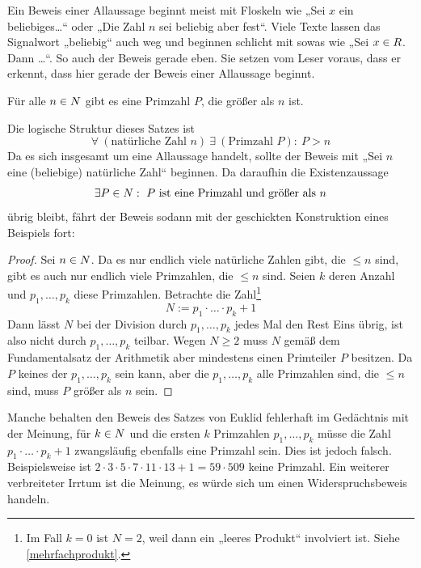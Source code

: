   
\begin{bem}[Signalwörter]
    Ein Beweis einer Allaussage beginnt meist mit Floskeln wie „Sei $x$ ein beliebiges\dots“ oder „Die Zahl $n$ sei beliebig aber fest“. Viele Texte lassen das Signalwort „beliebig“ auch weg und beginnen schlicht mit sowas wie „Sei $x\in \relax R$. Dann \dots“. So auch der Beweis gerade eben. Sie setzen vom Leser voraus, dass er erkennt, dass hier gerade der Beweis einer Allaussage beginnt.
\end{bem}


\begin{bsp} \label{euklid}
    Für alle $n\in \relax N$ gibt es eine Primzahl $P$, die größer als $n$ ist.
\end{bsp}
\begin{bem}
    Die logische Struktur dieses Satzes ist
        \[ \forall\ (\text{natürliche Zahl $n$})\ \exists\ (\text{Primzahl $P$}):\ P>n \]
    Da es sich insgesamt um eine Allaussage handelt, sollte der Beweis mit „Sei $n$ eine (beliebige) natürliche Zahl“ beginnen. Da daraufhin die Existenzaussage
        \[ \exists P\in \relax N:\ \text{$P$ ist eine Primzahl und größer als $n$} \]
    übrig bleibt, fährt der Beweis sodann mit der geschickten Konstruktion eines Beispiels fort:
\end{bem}
\begin{proof}
    Sei $n\in \relax N$. Da es nur endlich viele natürliche Zahlen gibt, die $\le n$ sind, gibt es auch nur endlich viele Primzahlen, die $\le n$ sind. Seien $k$ deren Anzahl und $p_1,\dots , p_k$ diese Primzahlen. Betrachte die Zahl\footnote{Im Fall $k=0$ ist $N=2$, weil dann ein „leeres Produkt“ involviert ist. Siehe \cref{mehrfachprodukt}.}
        \[ N := p_1\cdot\ldots\cdot p_k + 1 \]
    Dann lässt $N$ bei der Division durch $p_1,\dots , p_k$ jedes Mal den Rest Eins übrig, ist also nicht durch $p_1,\dots , p_k$ teilbar. Wegen $N\ge 2$ muss $N$ gemäß dem Fundamentalsatz der Arithmetik aber mindestens einen Primteiler $P$ besitzen. Da $P$ keines der $p_1,\dots ,p_k$ sein kann, aber die $p_1,\dots , p_k$ alle Primzahlen sind, die $\le n$ sind, muss $P$ größer als $n$ sein.
\end{proof}


\begin{bem}[*]
    Manche behalten den Beweis des Satzes von Euklid fehlerhaft im Gedächtnis mit der Meinung, für $k\in \relax N$ und die ersten $k$ Primzahlen $p_1,\dots , p_k$ müsse die Zahl $p_1\cdot\ldots\cdot p_k + 1$ zwangsläufig ebenfalls eine Primzahl sein. Dies ist jedoch falsch. Beispielsweise ist $2\cdot 3\cdot 5\cdot 7\cdot 11\cdot 13+1=59\cdot 509$ keine Primzahl. Ein weiterer verbreiteter Irrtum ist die Meinung, es würde sich um einen Widerspruchsbeweis handeln.
\end{bem}


